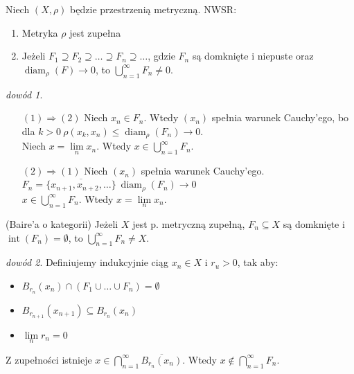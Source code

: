 \documentclass[twoside,10pt]{article}
\theoremstyle{definition}
\theoremstyle{definition}
\theoremstyle{definition}
\theoremstyle{definition}
\theoremstyle{remark}
\newtheorem*{dd}{dowód}
\theoremstyle{definition}
\theoremstyle{definition}
\theoremstyle{definition}
\theoremstyle{definition}
\theoremstyle{definition}
\theoremstyle{definition}
\begin{document}
\begin{tw} 
        Niech $(X,\rho)$ będzie przestrzenią metryczną. NWSR: 
        \begin{enumerate}[(1)]
            \item Metryka $\rho$ jest zupełna
            \item Jeżeli $F_1 \supseteq F_2 \supseteq \ldots \supseteq F_n \supseteq \ldots$, gdzie $F_n$ 
                są domknięte i niepuste oraz $\operatorname{diam}_\rho (F) \to 0$, to $\bigcup\limits_{n=1}^\infty F_n \neq 0$.
        \end{enumerate} 
\end{tw} 
\begin{dd} \hfill 
    \begin{itemize} 
        \item[$(1) \Rightarrow (2)$] Niech $x_n \in F_n$. Wtedy $(x_n)$ spełnia warunek Cauchy'ego, bo dla 
            $k > 0 \ \rho(x_k,x_n) \le \operatorname{diam}_\rho (F_n) \to 0$. \\ 
            Niech $x = \lim\limits_n x_n$. Wtedy $x \in \bigcup\limits_{n=1}^\infty F_n$.
        \item[$(2) \Rightarrow (1)$] Niech $(x_n)$ spełnia warunek Cauchy'ego. 
            $F_n = \overline{\{x_{n+1},x_{n+2},\ldots\}} \ \operatorname{diam}_\rho (F_n) \to 0$ \\
            $x \in \bigcup\limits_{n=1}^\infty F_n$. Wtedy $x = \lim\limits_n x_n$.
    \end{itemize} 
\end{dd} 
\begin{tw} (Baire'a o kategorii) Jeżeli $X$ jest p. metryczną zupełną, $F_n \subseteq X$ są domknięte i $\operatorname{int}(F_n) = \emptyset$,
to $\bigcup\limits_{n=1}^\infty F_n \neq X$. \end{tw} \begin{dd} Definiujemy indukcyjnie ciąg $x_n \in X$ i $r_u > 0$, tak aby: 
    \begin{itemize} 
        \item $B_{r_n}(x_n) \cap (F_1 \cup \ldots \cup F_n) = \emptyset$
        \item $B_{r_{n+1}}(x_{n+1}) \subseteq B_{r_n}(x_n) $
        \item $\lim\limits_n r_n = 0$
    \end{itemize} 
    Z zupełności istnieje $x \in \bigcap\limits_{n=1}^\infty \overline{B_{r_n}(x_n)}$. Wtedy 
    $x \notin \bigcap\limits_{n=1}^\infty F_n$. 
\end{dd} 
\end{document}
